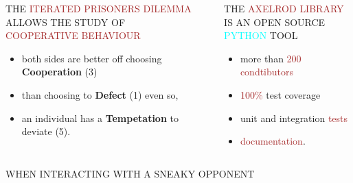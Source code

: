 \documentclass[usenames,dvipsnames,t]{beamer}
\begin{document}
\begin{frame}[fragile]

\begin{columns}
  \begin{column}{.33\linewidth}

    \centering
    \Large{THE \textcolor{brown}{ITERATED PRISONERS DILEMMA}
    ALLOWS THE STUDY OF \textcolor{brown}{COOPERATIVE BEHAVIOUR}}
    \Large{
    \begin{itemize}
      \item both sides are better off choosing \textbf{Cooperation} (3)
      \item than choosing to \textbf{Defect} (1) even so,
      \item an individual has a \textbf{Tempetation} to deviate (5).
    \end{itemize}
    }
  \end{column}
  \begin{column}{.30\linewidth}

  \begin{center}
   
   \end{center}
  \end{column}
  \begin{column}{.30\linewidth}

    \centering
    \Large{THE \textcolor{brown}{AXELROD} \textcolor{brown}{LIBRARY} IS AN 
    OPEN SOURCE \textcolor{cyan}{PYTHON} TOOL}
    \large{
    \begin{itemize}
    \item more than \textcolor{brown}{200 condtibutors}
    \item \textcolor{brown}{100\%} test coverage
    \item unit and integration \textcolor{brown}{tests}
    \item \textcolor{brown}{documentation}.
    \end{itemize}
    }
  \end{column}

  \end{columns}
  \begin{columns}
    \begin{column}{.30\linewidth}
   \vspace{1cm}

\begin{center}
\LARGE{\textcolor{red!80}{WHEN INTERACTING WITH A SNEAKY OPPONENT}}
\end{center}


\end{column}
\end{columns}
\end{frame}
\end{document}
